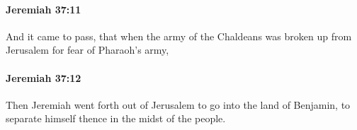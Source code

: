 		\paragraph{Jeremiah 37:11} %
			\label{JEREMIAH-37-11}

			And it came to pass, that when the army of the Chaldeans was broken up from Jerusalem for fear of Pharaoh’s army,


		\paragraph{Jeremiah 37:12} %
			\label{JEREMIAH-37-12}

			Then Jeremiah went forth out of Jerusalem to go into the land of Benjamin, to separate himself thence in the midst of the people.


